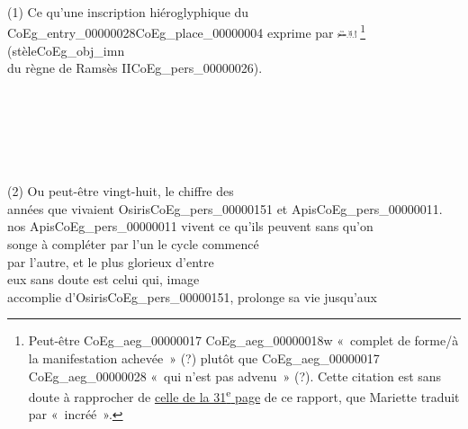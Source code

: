 \documentclass{book}
\begin{document}
{\begin{paracol}{2}
\noindent \\
\\
\\
\\
\\
\\
\\
\\
\\
\\
\\
\\
\\
\\
\\
\\
\\
\\
(1) Ce qu’une inscription hiéroglyphique du\\
\Gls{CoEg_entry_00000028}\gls{CoEg_place_00000004} exprime par \includegraphics[height=6pt]{CoEg_Mariette_hiero_1857-04-01_16.png} \footnote{Peut-être \foreignlanguage{translit}{\gls{CoEg_aeg_00000017} \gls{CoEg_aeg_00000018}w} «~complet de forme/à la manifestation achevée~» (?)  plutôt que \foreignlanguage{translit}{\gls{CoEg_aeg_00000017} \gls{CoEg_aeg_00000028}} «~qui n'est pas advenu~» (?). Cette citation est sans doute à rapprocher de \hyperlink{CoEg_Mariette_1857-04-01_31}{celle de la 31\textsuperscript{e} page} de ce rapport, que Mariette traduit par «~incréé~».} (stèle\gls{CoEg_obj_imn}\\
du règne de Ramsès II\gls{CoEg_pers_00000026}).\\
\\
\\
\\
\\
\\
\\
(2) Ou peut-être vingt-huit, le chiffre des\\
années que vivaient Osiris\gls{CoEg_pers_00000151} et Apis\gls{CoEg_pers_00000011}.
\switchcolumn
\noindent nos Apis\gls{CoEg_pers_00000011} vivent ce qu’ils peuvent sans qu’on\\
songe à compléter par l’un le cycle commencé\\
par l’autre, et le plus glorieux d’entre\\
eux sans doute est celui qui, image\\
accomplie d’Osiris\gls{CoEg_pers_00000151}, prolonge sa vie jusqu’aux\\

\end{paracol}}
\end{document}
